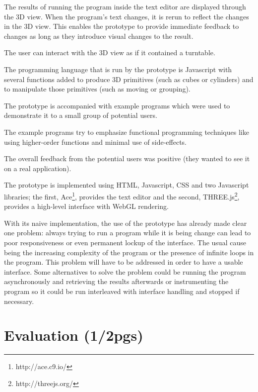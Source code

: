 \documentclass{./llncs2e/llncs}
\begin{document}
	The results of running the program inside the text editor are displayed through the 3D view. When the program's text changes, it is rerun to reflect the changes in the 3D view. This enables the prototype to provide immediate feedback to changes as long as they introduce visual changes to the result.

	The user can interact with the 3D view as if it contained a turntable.

	The programming language that is run by the prototype is Javascript with several functions added to produce 3D primitives (such as cubes or cylinders) and to manipulate those primitives (such as moving or grouping).

	The prototype is accompanied with example programs which were used to demonstrate it to a small group of potential users.

	The example programs try to emphasize functional programming techniques like using higher-order functions and minimal use of side-effects.

	The overall feedback from the potential users was positive (they wanted to see it on a real application).

	The prototype is implemented using HTML, Javascript, CSS and two Javascript libraries; the first, Ace\footnote{http://ace.c9.io/}, provides the text editor and the second, THREE.js\footnote{http://threejs.org/}, provides a high-level interface with WebGL rendering.

	With its naive implementation, the use of the prototype has already made clear one problem: always trying to run a program while it is being change can lead to poor responsiveness or even permanent lockup of the interface. The usual cause being the increasing complexity of the program or the presence of infinite loops in the program. This problem will have to be addressed in order to have a usable interface. Some alternatives to solve the problem could be running the program asynchronously and retrieving the results afterwards or instrumenting the program so it could be run interleaved with interface handling and stopped if necessary.



\section{Evaluation (1/2pgs)}

\end{document}
